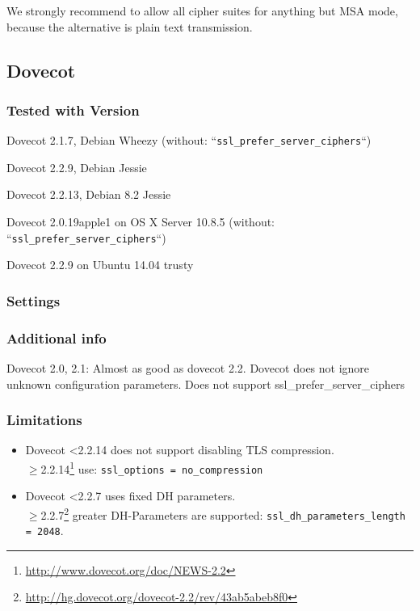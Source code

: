 
We strongly recommend to allow all cipher suites for anything but MSA
mode, because the alternative is plain text transmission.

\subsection{Dovecot}


\subsubsection{Tested with Version}
\begin{itemize*}
  \item Dovecot 2.1.7, Debian Wheezy (without: ``\texttt{ssl\_prefer\_server\_ciphers}``)
  \item Dovecot 2.2.9, Debian Jessie
  \item Dovecot 2.2.13, Debian 8.2 Jessie
  \item Dovecot 2.0.19apple1 on OS X Server 10.8.5 (without: ``\texttt{ssl\_prefer\_server\_ciphers}``)
  \item Dovecot 2.2.9 on Ubuntu 14.04 trusty
\end{itemize*}

\subsubsection{Settings}


\subsubsection{Additional info}
Dovecot 2.0, 2.1: Almost as good as dovecot 2.2. Dovecot does not ignore unknown configuration parameters. Does not support
ssl\_prefer\_server\_ciphers

\subsubsection{Limitations}
\begin{itemize}
	\item Dovecot <2.2.14 does not support disabling TLS compression.\\ 
		{\(\geq\)2.2.14}\footnote{\url{http://www.dovecot.org/doc/NEWS-2.2}} 
		use: \texttt{ssl\_options = no\_compression}
	\item Dovecot <2.2.7 uses fixed DH parameters.\\
		{\(\geq\)2.2.7}\footnote{\url{http://hg.dovecot.org/dovecot-2.2/rev/43ab5abeb8f0}} 
		greater DH-Parameters are supported: \texttt{ssl\_dh\_parameters\_length = 2048}. 
\end{itemize}

